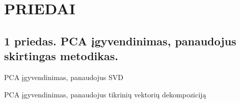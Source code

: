 \documentclass[]{vgtuef}
\begin{document}
\section*{PRIEDAI}

\subsection*{1 priedas. PCA įgyvendinimas, panaudojus skirtingas metodikas.}
\begin{cfigure}[h]
  \centering
  \caption{PCA įgyvendinimas, panaudojus SVD}
  \label{code:pca_svd}
  
\end{cfigure}


\begin{cfigure}[t]
  \centering
  \caption{PCA įgyvendinimas, panaudojus tikrinių vektorių dekompoziciją}
  \label{code:pca_eig}
  
\end{cfigure}
\end{document}
